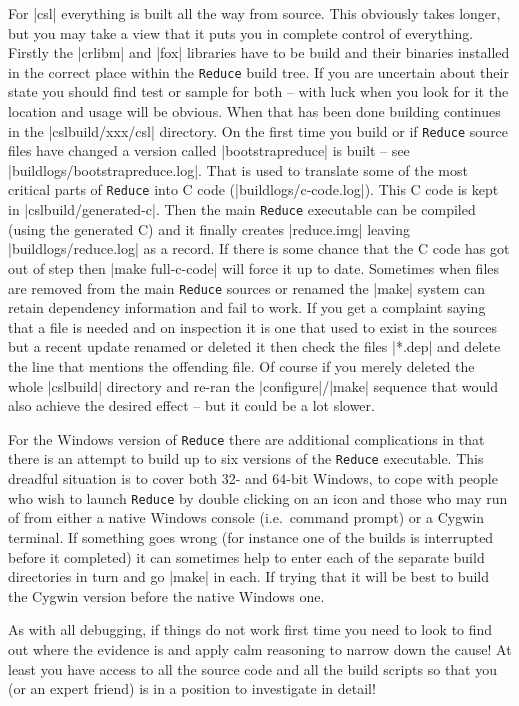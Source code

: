 \documentclass[12pt,twoside,openright]{memoir}
\newcommand{\reduce}{\texttt{Reduce}\xspace}
\begin{document}
\begin{enumerate}
For |csl| everything is built all the way from source. This obviously takes
longer, but you may take a view that it puts you in complete control of
everything. Firstly the |crlibm| and |fox| libraries have to be build and their
binaries installed in the correct place within the \reduce build tree. If you
are uncertain about their state you should find test or sample for both -- with
luck when you look for it the location and usage will be obvious. When that has
been done building continues in the |cslbuild/xxx/csl| directory. On the first
time you build or if \reduce source files have changed a version called
|bootstrapreduce| is built -- see |buildlogs/bootstrapreduce.log|. That is used
to translate some of the most critical parts of \reduce into C code
(|buildlogs/c-code.log|). This C code is kept in |cslbuild/generated-c|. Then
the main \reduce executable can be compiled (using the generated C) and it
finally creates |reduce.img| leaving |buildlogs/reduce.log| as a record. If
there is some chance that the C code has got out of step then
%
|make full-c-code|
%
will force it up to date. Sometimes when files are removed from
the main \reduce sources or renamed the |make| system can retain dependency
information and fail to work. If you get a complaint saying that a file is
needed and on inspection it is one that used to exist in the sources but a
recent update renamed or deleted it then check the files |*.dep| and delete the
line that mentions the offending file. Of course if you merely deleted the
whole |cslbuild| directory and re-ran the |configure|/|make| sequence that
would also achieve the desired effect -- but it could be a lot slower.

For the Windows version of \reduce there are additional complications in that
there is an attempt to build up to six versions of the \reduce executable.
This dreadful situation is to cover both 32- and 64-bit Windows, to cope with
people who wish to launch \reduce by double clicking on an icon and those
who may run of from either a native Windows console (i.e.\ command prompt)
or a Cygwin terminal. If something goes wrong (for instance one of the
builds is interrupted before it completed) it can sometimes help to enter
each of the separate build directories in turn and go |make| in each. If trying
that it will be best to build the Cygwin version before the native Windows
one.

As with all debugging, if things do not work first time you need to look
to find out where the evidence is and apply calm reasoning to narrow down the
cause! At least you have access to all the source code and all the build
scripts so that you (or an expert friend) is in a position to investigate
in detail!


\end{enumerate}
\end{document}

